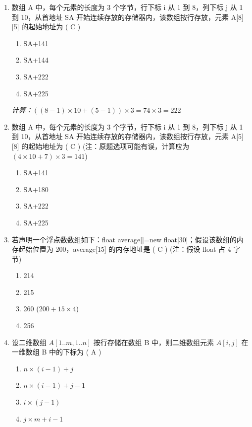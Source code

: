 \documentclass[12pt, a4paper]{article}
\begin{document}
\begin{enumerate}[label=\arabic*.]
    \item 数组 A 中，每个元素的长度为 3 个字节，行下标 i 从 1 到 8，列下标 j 从 1 到 10，从首地址 SA 开始连续存放的存储器内，该数组按行存放，元素 A[8][5] 的起始地址为 ( C )
    \begin{enumerate}
        \item SA+141
        \item SA+144
        \item SA+222
        \item SA+225
    \end{enumerate}
    \textit{计算：$( (8-1) \times 10 + (5-1) ) \times 3 = 74 \times 3 = 222$}

    \item 数组 A 中，每个元素的长度为 3 个字节，行下标 i 从 1 到 8，列下标 j 从 1 到 10，从首地址 SA 开始连续存放的存储器内，该数组按行存放，元素 A[5][8] 的起始地址为 ( C ) (注：原题选项可能有误，计算应为 $(4 \times 10 + 7) \times 3 = 141$)
    \begin{enumerate}
        \item SA+141
        \item SA+180
        \item SA+222
        \item SA+225
    \end{enumerate}

    \item 若声明一个浮点数数组如下：float average[]=new float[30]；假设该数组的内存起始位置为 200，average[15] 的内存地址是 ( C ) (注：假设 float 占 4 字节)
    \begin{enumerate}
        \item 214
        \item 215
        \item 260 ($200 + 15 \times 4$)
        \item 256
    \end{enumerate}

    \item 设二维数组 $A[1..m, 1..n]$ 按行存储在数组 B 中，则二维数组元素 $A[i, j]$ 在一维数组 B 中的下标为 ( A )
    \begin{enumerate}
        \item $n \times (i-1) + j$
        \item $n \times (i-1) + j - 1$
        \item $i \times (j-1)$
        \item $j \times m + i - 1$
    \end{enumerate}


\end{enumerate}
\end{document}
